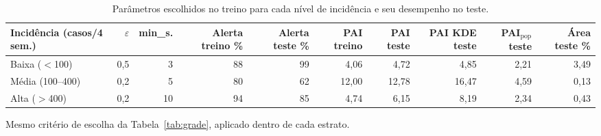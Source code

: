 \begin{table}[htbp]
\centering
\small
\caption{Parâmetros escolhidos no treino para cada nível de incidência e seu desempenho no teste.}
\label{tab:guia}
\begin{adjustbox}{max width=\linewidth}
\begin{tabular}{lrrrrrrrrr}
\toprule
Incidência (casos/4 sem.) & $\varepsilon$ & min\_s. & Alerta treino \% & Alerta teste \% & PAI treino & PAI teste & PAI KDE teste & PAI$_\text{pop}$ teste & Área teste \% \\
\midrule
Baixa ($<$100) & 0,5 & 3 & 88 & 99 & 4,06 & 4,72 & 4,85 & 2,21 & 3,49 \\
Média (100--400) & 0,2 & 5 & 80 & 62 & 12,00 & 12,78 & 16,47 & 4,59 & 0,13 \\
Alta ($>$400) & 0,2 & 10 & 94 & 85 & 4,74 & 6,15 & 8,19 & 2,34 & 0,43 \\
\bottomrule
\end{tabular}
\end{adjustbox}
\par\smallskip\begin{minipage}{0.95\linewidth}\footnotesize Mesmo critério de escolha da Tabela~\ref{tab:grade}, aplicado dentro de cada estrato.\end{minipage}
\end{table}

